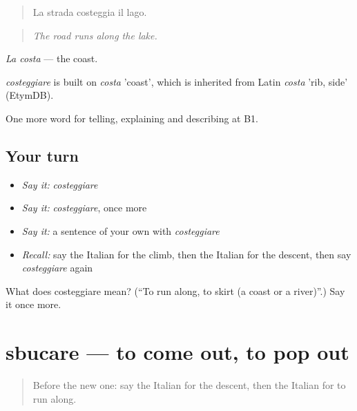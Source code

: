 \begin{quote}
La strada costeggia il lago.
\end{quote}

\begin{quote}
\emph{The road runs along the lake.}
\end{quote}

\emph{La costa} — the coast.

\begin{cousinweb}
\emph{costeggiare} is built on \emph{costa} 'coast', which is inherited from Latin \emph{costa} 'rib, side' (EtymDB).
\end{cousinweb}

\begin{grammarlens}[title={What you've built}]
One more word for telling, explaining and describing at B1.
\end{grammarlens}

\subsection*{Your turn}
\begin{itemize}
\raggedright
  \item \emph{Say it:} \emph{costeggiare}
  \item \emph{Say it:} \emph{costeggiare}, once more
  \item \emph{Say it:} a sentence of your own with \emph{costeggiare}
  \item \emph{Recall:} say the Italian for the climb, then the Italian for the descent, then say \emph{costeggiare} again
\end{itemize}

\begin{tcolorbox}[breakable,colback=teal!4,colframe=teal!35!black,title={Before you move on}]
What does costeggiare mean? (\textquotedblleft{}To run along, to skirt (a coast or a river)\textquotedblright{}.) Say it once more.
\end{tcolorbox}
\section[sbucare]{sbucare — to come out, to pop out}

\label{lesson:IT-C442-sbucare}



\begin{quote}
Before the new one: say the Italian for the descent, then the Italian for to run along.
\end{quote}

